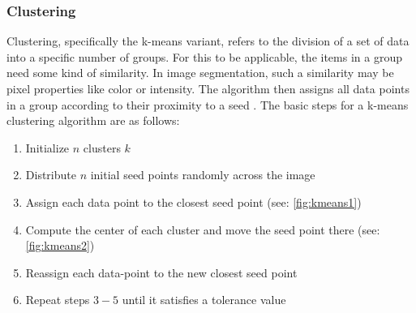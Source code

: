 \subsubsection{Clustering}
Clustering, specifically the k-means variant, refers to the division of a set of data into
a specific number of groups.
For this to be applicable, the items in a group need some kind of similarity.
In image segmentation, such a similarity may be pixel properties like color or intensity.
The algorithm then assigns all data points in a group according to their proximity to a seed \cite{dhanachandraImageSegmentationUsing2015}.
The basic steps for a k-means clustering algorithm are as follows:
\begin{enumerate}
	\item Initialize $n$ clusters $k$
	\item Distribute $n$ initial seed points randomly across the image
	\item Assign each data point to the closest seed point (see: \cref{fig:kmeans1})
	\item Compute the center of each cluster and move the seed point there (see: \cref{fig:kmeans2})
	\item Reassign each data-point to the new closest seed point
	\item Repeat steps $3 - 5$ until it satisfies a tolerance value
\end{enumerate}
